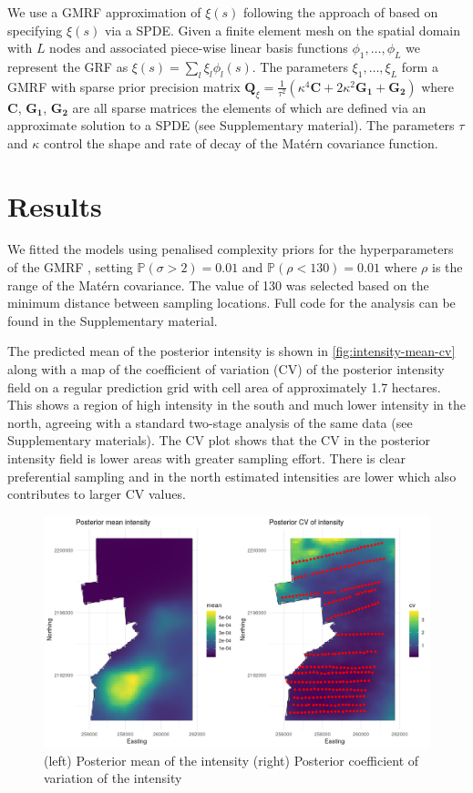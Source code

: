 \documentclass[preprint,12pt]{elsarticle}
\newcommand{\bm}{\boldsymbol}  %
\begin{document}
We use a GMRF approximation of $\xi(s)$ following the approach of \cite{lindgren_explicit_2011} based on specifying $\xi(s)$ via a SPDE.  Given a finite element mesh on the spatial domain with $L$ nodes and associated piece-wise linear basis functions $\phi_1, \ldots, \phi_L$ we represent the GRF as $\xi(s) = \sum_l \xi_l \phi_l(s)$.  The parameters $\xi_1, \ldots, \xi_L$ form a GMRF with sparse prior precision matrix $\bm{Q}_{\xi} = \frac{1}{\tau^2}\left(\kappa^4\bm{C} + 2\kappa^2\bm{G_1} + \bm{G_2}\right)$ where $\bm{C}$, $\bm{G_1}$, $\bm{G_2}$ are all sparse matrices the elements of which are defined via an approximate solution to a SPDE (see Supplementary material). The parameters $\tau$ and $\kappa$ control the shape and rate of decay of the Mat\'ern covariance function.

\section{Results}

We fitted the models using penalised complexity priors for the hyperparameters of the GMRF \citep{simpson_penalising_2017}, setting $\mathbb{P}(\sigma > 2) = 0.01$ and $\mathbb{P}(\rho < 130) = 0.01$ where $\rho$ is the range of the Mat\'ern covariance.  The value of 130 was selected based on the minimum distance between sampling locations.  Full code for the analysis can be found in the Supplementary material.

The predicted mean of the posterior intensity is shown in \autoref{fig:intensity-mean-cv} along with a map of the coefficient of variation (CV) of the posterior intensity field on a regular prediction grid with cell area of approximately 1.7 hectares.  This shows a region of high intensity in the south and much lower intensity in the north, agreeing with a standard two-stage analysis of the same data (see Supplementary materials).  The CV plot shows that the CV in the posterior intensity field is lower areas with greater sampling effort.  There is clear preferential sampling and in the north estimated intensities are lower which also contributes to larger CV values.
\begin{figure}
	\includegraphics[scale=0.5]{figures/intensity_mean_cv.png}
	\caption{(left) Posterior mean of the intensity (right) Posterior coefficient of variation of the intensity}
	\label{fig:intensity-mean-cv}
\end{figure}
\end{document}
